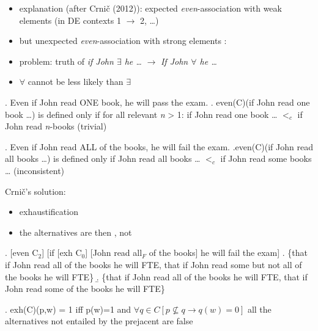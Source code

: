 \documentclass[ignorenonframetext,]{beamer}
\providecommand{\tightlist}{%
  \setlength{\itemsep}{0pt}\setlength{\parskip}{0pt}}
\begin{document}
\begin{frame}

\begin{itemize}
\tightlist
\item
  explanation (after Crnič (2012)): expected \emph{even}-association
  with weak elements \Next (in DE contexts 1 \(\rightarrow\) 2,
  \ldots{})
\item
  but unexpected \emph{even}-association with strong elements \NNext:
\item
  problem: truth of \emph{if John \(\exists\) he \ldots{}}
  \(\rightarrow\) \emph{If John \(\forall\) he \ldots{}}
\item
  \(\forall\) cannot be less likely than \(\exists\)
\end{itemize}

\ex. Even if John read ONE book, he will pass the exam. \a. even(C)(if
John read one book \ldots{}) is defined only if for all relevant
\emph{n} \textgreater{} 1: if John read one book \ldots{} \(<_c\) if
John read \emph{n}-books \hfill (trivial)

\ex. Even if John read ALL of the books, he will fail the exam.
\a.even(C)(if John read all books \ldots{}) is defined only if John read
all books \ldots{} \(<_c\) if John read some books \ldots{}
\hfill (inconsistent)

\end{frame}

\begin{frame}

Crnič's solution:

\begin{itemize}
\tightlist
\item
  exhaustification
\item
  the alternatives are then \Next[a], not \Next[b]
\end{itemize}

\ex. {[}even C\(_2\){]} {[}if {[}exh C\(_0\){]} {[}John read all\(_F\)
of the books{]} he will fail the exam{]} \a. \{that if John read all of
the books he will FTE, that if John read some but not all of the books
he will FTE\} \b. \{that if John read all of the books he will FTE, that
if John read some of the books he will FTE\}

\ex. exh(C)(p,w) = 1 iff p(w)=1 and
\(\forall q\in C[p \not\subseteq q \rightarrow q(w) = 0]\)\newline
all the alternatives not entailed by the prejacent are false

\end{frame}
\end{document}
